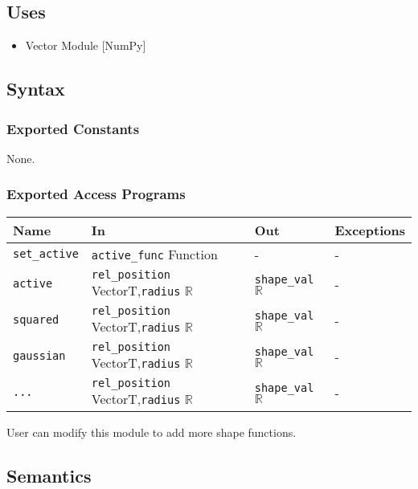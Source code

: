 \documentclass[12pt, titlepage]{article}
\begin{document}
\subsection{Uses}
\begin{itemize}
\item Vector Module [NumPy]
\end{itemize}

\subsection{Syntax}

\subsubsection{Exported Constants}
None.

\subsubsection{Exported Access Programs}
\begin{center}
\begin{tabular}{p{2cm} p{5.6cm} p{3cm} p{2cm}}
\hline
\textbf{Name} & \textbf{In} & \textbf{Out} & \textbf{Exceptions} \\
\hline
\texttt{set\_active} & \texttt{active\_func} Function & - & - \\
\texttt{active}& \texttt{rel\_position} VectorT,\newline\texttt{radius} $\mathbb{R}$ & \texttt{shape\_val} $\mathbb{R}$ & - \\
\texttt{squared}& \texttt{rel\_position} VectorT,\newline\texttt{radius} $\mathbb{R}$ & \texttt{shape\_val} $\mathbb{R}$ & - \\
\texttt{gaussian}& \texttt{rel\_position} VectorT,\newline\texttt{radius} $\mathbb{R}$ & \texttt{shape\_val} $\mathbb{R}$ & - \\
\texttt{...}& \texttt{rel\_position} VectorT,\newline\texttt{radius} $\mathbb{R}$ & \texttt{shape\_val} $\mathbb{R}$ & - \\
\hline
\end{tabular}
\end{center}
User can modify this module to add more shape functions.

\subsection{Semantics}
\end{document}
